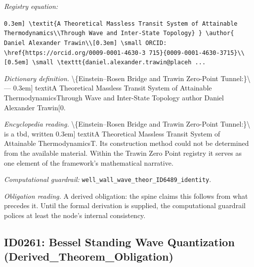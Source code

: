 \documentclass[11pt]{article}
\theoremstyle{remark}
\begin{document}
\noindent\textit{Registry equation:}\par
{\small\texttt{0.3em] \textbackslash{}textit\{A Theoretical Massless Transit System of Attainable Thermodynamics\textbackslash{}\textbackslash{}Through Wave and Inter-State Topology\} \} \textbackslash{}author\{ Daniel Alexander Trawin\textbackslash{}\textbackslash{}[0.3em] \textbackslash{}small ORCID: \textbackslash{}href\{https://orcid.org/0009-0001-4630-3 715\}\{0009-0001-4630-3715\}\textbackslash{}\textbackslash{}[0.5em] \textbackslash{}small \textbackslash{}texttt\{daniel.alexander.trawin@placeh ...}}\par\medskip
\noindent\textit{Dictionary definition.} \textbackslash{}\{Einstein--Rosen Bridge and Trawin Zero-Point Tunnel:\}\textbackslash{} --- 0.3em] textitA Theoretical Massless Transit System of Attainable ThermodynamicsThrough Wave and Inter-State Topology author Daniel Alexander Trawin[0.\par\medskip
\noindent\textit{Encyclopedia reading.} \textbackslash{}\{Einstein--Rosen Bridge and Trawin Zero-Point Tunnel:\}\textbackslash{} is a tbd, written 0.3em] textitA Theoretical Massless Transit System of Attainable ThermodynamicsT. Its construction method could not be determined from the available material. Within the Trawin Zero Point registry it serves as one element of the framework's mathematical narrative.
\par\medskip\noindent\textit{Computational guardrail:} \texttt{well\_wall\_wave\_theor\_ID6489\_identity}.
\par\medskip\noindent\textit{Obligation reading.} A derived obligation: the spine claims this follows from what precedes it. Until the formal derivation is supplied, the computational guardrail polices at least the node's internal consistency.

\subsection{ID0261: Bessel Standing Wave Quantization (Derived\_Theorem\_Obligation)}
\end{document}
